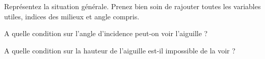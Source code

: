 \documentclass{cours}
\begin{document}
\begin{question}
    Représentez la situation générale. Prenez bien soin de rajouter toutes les variables utiles, indices des milieux et angle compris.
\end{question}

\begin{question}
    A quelle condition sur l'angle d'incidence peut-on voir l'aiguille ? 
\end{question}

\begin{question}
    A quelle condition sur la hauteur de l'aiguille est-il impossible de la voir ? 
\end{question}
\end{document}
